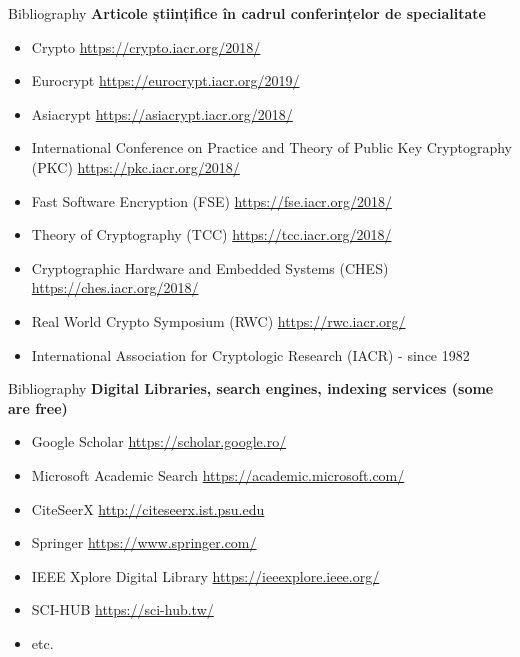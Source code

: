 \documentclass[pdf]{beamer}
\begin{document}
\begin{frame}{Bibliography}
\textbf{Articole științifice în cadrul conferințelor de specialitate}
\begin{itemize}
\item
Crypto \url{https://crypto.iacr.org/2018/}
\item
Eurocrypt \url{https://eurocrypt.iacr.org/2019/}
\item
Asiacrypt \url{https://asiacrypt.iacr.org/2018/}
\item
International Conference on Practice and Theory of Public Key Cryptography (PKC) \url{https://pkc.iacr.org/2018/}
\item
Fast Software Encryption (FSE) \url{https://fse.iacr.org/2018/}
\item
Theory of Cryptography (TCC) \url{https://tcc.iacr.org/2018/}
\item
Cryptographic Hardware and Embedded Systems (CHES) \url{https://ches.iacr.org/2018/}
\item
Real World Crypto Symposium (RWC) \url{https://rwc.iacr.org/}
\item
International Association for Cryptologic Research (IACR) - since 1982
\end{itemize}
\end{frame}



\begin{frame}{Bibliography}
\textbf{Digital Libraries, search engines, indexing services (some are free)}
\begin{itemize}
\item
Google Scholar \url{https://scholar.google.ro/}
\item
Microsoft Academic Search \url{https://academic.microsoft.com/}
\item
CiteSeerX \url{http://citeseerx.ist.psu.edu}
\item
Springer \url{https://www.springer.com/}
\item
IEEE Xplore Digital Library \url{https://ieeexplore.ieee.org/}
\item
SCI-HUB \url{https://sci-hub.tw/}
\item
etc.
\end{itemize}
\end{frame}
\end{document}
